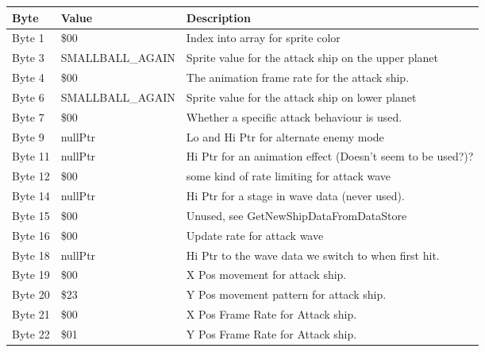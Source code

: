 \begin{figure}[H]
{\begin{adjustbox}{width=12cm}
\begin{tabular}{lll}
\toprule
 Byte    & Value                      & Description                                                        \\
\midrule
 Byte 1  & \$00                        & Index into array for sprite color                                  \\
 Byte 3  & SMALLBALL\_AGAIN            & Sprite value for the attack ship on the upper planet               \\
 Byte 4  & \$00                        & The animation frame rate for the attack ship.                      \\
 Byte 6  & SMALLBALL\_AGAIN            & Sprite value for the attack ship on lower planet                   \\
 Byte 7  & \$00                        & Whether a specific attack behaviour is used.                       \\
 Byte 9  & nullPtr                    & Lo and Hi Ptr for alternate enemy mode                             \\
 Byte 11 & nullPtr                    & Hi Ptr for an animation effect (Doesn't seem to be used?)?         \\
 Byte 12 & \$00                        & some kind of rate limiting for attack wave                         \\
 Byte 14 & nullPtr                    & Hi Ptr for a stage in wave data (never used).                      \\
 Byte 15 & \$00                        & Unused, see GetNewShipDataFromDataStore                            \\
 Byte 16 & \$00                        & Update rate for attack wave                                        \\
 Byte 18 & nullPtr                    & Hi Ptr to the wave data we switch to when first hit.               \\
 Byte 19 & \$00                        & X Pos movement for attack ship.                                    \\
 Byte 20 & \$23                        & Y Pos movement pattern for attack ship.                            \\
 Byte 21 & \$00                        & X Pos Frame Rate for Attack ship.                                  \\
 Byte 22 & \$01                        & Y Pos Frame Rate for Attack ship.                                  \\

\end{tabular}
\end{adjustbox}}
\end{figure}
